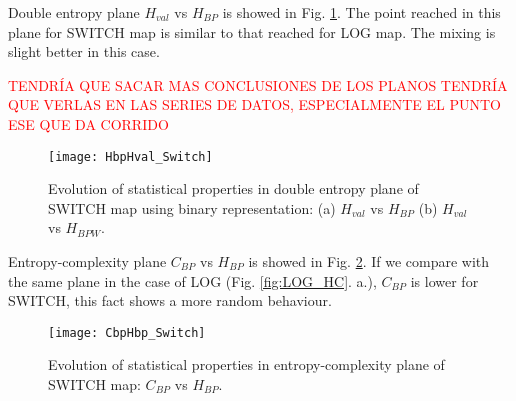 Double entropy plane $H_{val}$ vs $H_{BP}$ is showed in Fig. \ref{fig:SWITCH_HH}.
The point reached in this plane for SWITCH map is similar to that reached for LOG map.
The mixing is slight better in this case.

\textcolor{red}{TENDRÍA QUE SACAR MAS CONCLUSIONES DE LOS PLANOS TENDRÍA QUE VERLAS EN LAS SERIES DE DATOS, ESPECIALMENTE EL PUNTO ESE QUE DA CORRIDO}

\begin{figure}
	\texttt{[image: HbpHval\_Switch]}
	\caption{Evolution of statistical properties in double entropy plane of SWITCH map using binary representation: (a) $H_{val}$ vs $H_{BP}$ (b) $H_{val}$ vs $H_{BPW}$.}
	\label{fig:SWITCH_HH}
\end{figure}

Entropy-complexity plane $C_{BP}$ vs $H_{BP}$ is showed in Fig. \ref{fig:SWITCH_HC}.
If we compare with the same plane in the case of LOG (Fig. \ref{fig:LOG_HC}. a.), $C_{BP}$ is lower for SWITCH, this fact shows a more random behaviour.

\begin{figure}
	\texttt{[image: CbpHbp\_Switch]}
	\caption{Evolution of statistical properties in entropy-complexity plane of SWITCH map: $C_{BP}$ vs $H_{BP}$.}
	\label{fig:SWITCH_HC}
\end{figure}